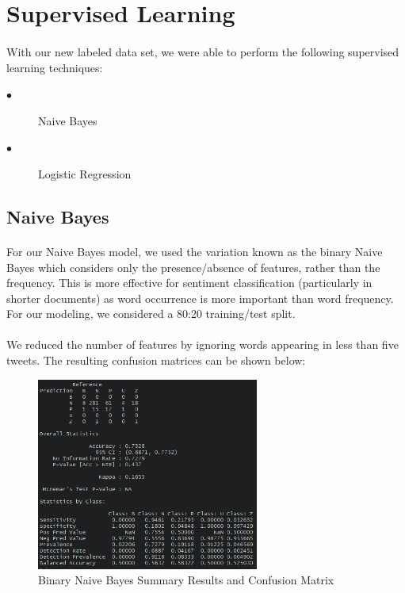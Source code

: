 \documentclass{article}
\begin{document}

\section{Supervised Learning}
\paragraph{}
With our new labeled data set, we were able to perform the following supervised learning techniques:

\begin{description}
  \item[$\bullet$ ] Naive Bayes
  \item[$\bullet$ ] Logistic Regression
\end{description}

\subsection{Naive Bayes}
\paragraph{}
For our Naive Bayes model, we used the variation known as the binary Naive Bayes which considers only the presence/absence of features, rather than the frequency.  This is more effective for sentiment classification (particularly in shorter documents) as word occurrence is more important than word frequency.  For our modeling, we considered a 80:20 training/test split.  

\paragraph{}
We reduced the number of features by ignoring words appearing in less than five tweets.  The resulting confusion matrices can be shown below:

\begin{figure}[H]
\begin{center}
\includegraphics[width=0.65\textwidth]{Images/BNB_Results.png}
\caption{Binary Naive Bayes Summary Results and Confusion Matrix}
\label{fig:BNB Results}
\end{center}
\end{figure}     
\end{document}
